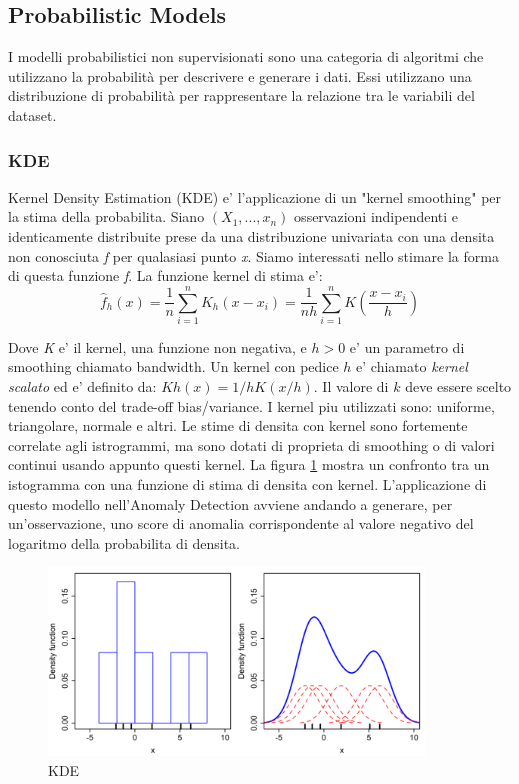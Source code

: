 \subsection{Probabilistic Models}
I modelli probabilistici non supervisionati sono una categoria di algoritmi che utilizzano la probabilità per descrivere e generare i dati. Essi utilizzano una distribuzione di probabilità per rappresentare la relazione tra le variabili del dataset.
\subsubsection{KDE}
Kernel Density Estimation (KDE) e' l'applicazione di un "kernel smoothing" per la stima della probabilita. 
Siano $(X_1,...,x_n)$ osservazioni indipendenti e identicamente distribuite prese da una distribuzione univariata con una densita non conosciuta \textit{f} per qualasiasi punto \textit{x}. Siamo interessati nello stimare la forma di questa funzione \textit{f}. La funzione kernel di stima e':
\[\widehat{f}_h(x)=\frac{1}{n} \sum_{i=1}^n K_h\left(x-x_i\right)=\frac{1}{n h} \sum_{i=1}^n K\left(\frac{x-x_i}{h}\right)\]

Dove \textit{K} e' il kernel, una funzione non negativa, e $h>0$ e' un parametro di smoothing chiamato bandwidth. Un kernel con pedice $h$ e' chiamato \textit{kernel scalato} ed e' definito da: $Kh(x) = 1/h K(x/h)$. 
Il valore di $k$ deve essere scelto tenendo conto del trade-off bias/variance.
I kernel piu utilizzati sono: uniforme, triangolare, normale e altri.
Le stime di densita con kernel sono fortemente correlate agli istrogrammi, ma sono dotati di proprieta di smoothing o di valori continui usando appunto questi kernel.
La figura \ref{kde_model} mostra un confronto tra un istogramma con una funzione di stima di densita con kernel.
L'applicazione di questo modello nell'Anomaly Detection avviene andando a generare, per un'osservazione, uno score di anomalia corrispondente al valore negativo del logaritmo della probabilita di densita.

\begin{figure}[t]
	\centering
	\includegraphics[width=10cm, scale=1]{images/kde_model}
	\caption{KDE}
	\label{kde_model}
\end{figure}


